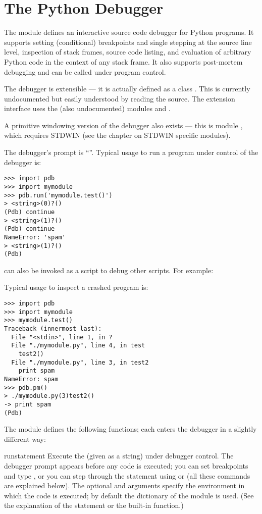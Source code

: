 \chapter{The Python Debugger}
\label{module-pdb}


The module  defines an interactive source code debugger for
Python programs.  It supports setting
(conditional) breakpoints and single stepping
at the source line level, inspection of stack frames, source code
listing, and evaluation of arbitrary Python code in the context of any
stack frame.  It also supports post-mortem debugging and can be called
under program control.

The debugger is extensible --- it is actually defined as a class
.  This is currently undocumented but easily understood by
reading the source.  The extension interface uses the (also
undocumented) modules  and .

A primitive windowing version of the debugger also exists --- this is
module , which requires STDWIN (see the chapter on STDWIN
specific modules).

The debugger's prompt is ``''.
Typical usage to run a program under control of the debugger is:

\begin{verbatim}
>>> import pdb
>>> import mymodule
>>> pdb.run('mymodule.test()')
> <string>(0)?()
(Pdb) continue
> <string>(1)?()
(Pdb) continue
NameError: 'spam'
> <string>(1)?()
(Pdb) 
\end{verbatim}
%
 can also be invoked as
a script to debug other scripts.  For example:

Typical usage to inspect a crashed program is:

\begin{verbatim}
>>> import pdb
>>> import mymodule
>>> mymodule.test()
Traceback (innermost last):
  File "<stdin>", line 1, in ?
  File "./mymodule.py", line 4, in test
    test2()
  File "./mymodule.py", line 3, in test2
    print spam
NameError: spam
>>> pdb.pm()
> ./mymodule.py(3)test2()
-> print spam
(Pdb) 
\end{verbatim}
%
The module defines the following functions; each enters the debugger
in a slightly different way:

\begin{funcdesc}{run}{statement}
Execute the  (given as a string) under debugger
control.  The debugger prompt appears before any code is executed; you
can set breakpoints and type , or you can step through
the statement using  or  (all these commands are
explained below).  The optional  and 
arguments specify the environment in which the code is executed; by
default the dictionary of the module  is used.  (See
the explanation of the  statement or the 
built-in function.)
\end{funcdesc}

